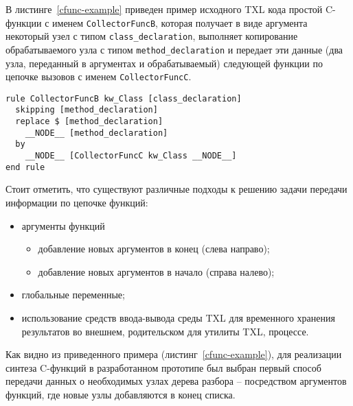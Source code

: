В листинге~\ref{cfunc-example} приведен пример исходного TXL кода простой C-функции с именем \lstinline{CollectorFuncB}, которая получает в виде аргумента некоторый узел с типом \lstinline{class_declaration}, выполняет копирование обрабатываемого узла с типом \lstinline{method_declaration} и передает эти данные (два узла, переданный в аргументах и обрабатываемый) следующей функции по цепочке вызовов с именем \lstinline{CollectorFuncC}.

\begin{lstlisting}[frame=single, language=TXL, label={cfunc-example}, caption={Пример синтезированной C-функции.}]
rule CollectorFuncB kw_Class [class_declaration]
  skipping [method_declaration]
  replace $ [method_declaration]
    __NODE__ [method_declaration]
  by
    __NODE__ [CollectorFuncC kw_Class __NODE__]
end rule
\end{lstlisting}

Стоит отметить, что существуют различные подходы к решению задачи передачи информации по цепочке функций:
\begin {itemize}[noitemsep]
  \item аргументы функций
    \begin{itemize}[noitemsep]
      \item добавление новых аргументов в конец (слева направо);
      \item добавление новых аргументов в начало (справа налево);
    \end{itemize}
  \item глобальные переменные;
  \item использование средств ввода-вывода среды TXL для временного хранения результатов во внешнем, родительском для утилиты TXL, процессе.
\end{itemize}

Как видно из приведенного примера (листинг~\ref{cfunc-example}), для реализации синтеза C-функций в разработанном прототипе был выбран первый способ передачи данных о необходимых узлах дерева разбора -- посредством аргументов функций, где новые узлы добавляются в конец списка.

